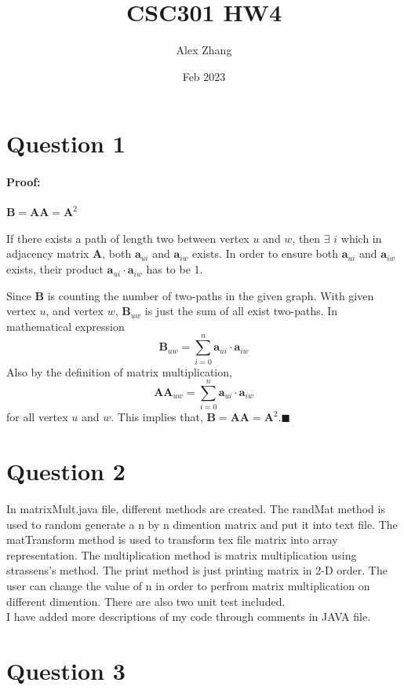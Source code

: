 \documentclass{article}
\title{CSC301 HW4}
\author{Alex Zhang}
\date{Feb 2023}
\newcommand{\mat}[1]{\mathbf{#1}}
\begin{document}
\maketitle
\section*{Question 1}
\paragraph{Proof:} $\mat{B} = \mat{A}\mat{A} = \mat{A}^2$

If there exists a path of length two between vertex $u$ and $w$, then $\exists $ $i$ which 
in adjacency matrix $\mat{A}$, both $\mat{a}_{ui}$ and $\mat{a}_{iw}$ exists.
In order to ensure both $\mat{a}_{ui}$ and $\mat{a}_{iw}$ exists, their product $\mat{a}_{ui} \cdot \mat{a}_{iw}$
has to be 1.

Since $\mat{B}$ is counting the number of two-paths in the given graph. With given vertex $u$, and vertex $w$, $\mat{B}_{uw}$
is just the sum of all exist two-paths. In mathematical expression $$\mat{B}_{uw} = \sum^{n}_{i=0}\mat{a}_{ui}\cdot \mat{a}_{iw}$$
Also by the definition of matrix multiplication, 
$$\mat{A}\mat{A}_{uw} = \sum^{n}_{i=0}\mat{a}_{ui}\cdot \mat{a}_{iw}$$
for all vertex $u$ and $w$. This implies that,
$\mat{B} = \mat{A}\mat{A} = \mat{A}^2$.$\blacksquare$

\section*{Question 2}
In matrixMult.java file, different methods are created. The randMat method is used to random generate a n by n dimention
matrix and put it into text file. The matTransform method is used to transform tex file matrix into array representation.
The multiplication method is matrix multiplication using strassens's method. The print method is just printing matrix in 2-D order.
The user can change the value of n in order to perfrom matrix multiplication on different dimention. There are also two unit test included.
\\
I have added more descriptions of my code through comments in JAVA file.



\section*{Question 3}
\end{document}

